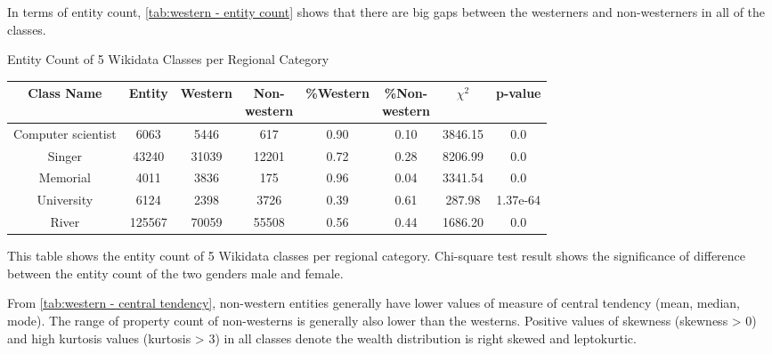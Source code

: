 In terms of entity count, \autoref{tab:western - entity count} shows that there are big gaps between the westerners and non-westerners in all of the classes.

\begin{center}
\scriptsize
\begin{threeparttable}
\captionsetup{font=small}
\caption{Entity Count of 5 Wikidata Classes per Regional Category}
\label{tab:western - entity count}
\begin{tabular}{c | c c c c c c c} 

\toprule
    Class Name & Entity & Western & \CellWithForceBreak{Non- \\ western} & \%Western & \CellWithForceBreak{\%Non- \\ western}& $\chi^2$ & p-value \\ [0.5ex] 
\midrule
    Computer scientist & 6063 & 5446 & 617 & 0.90 & 0.10 & 3846.15 & 0.0 \\
    Singer & 43240 & 31039 & 12201 & 0.72 & 0.28 & 8206.99 & 0.0 \\
    Memorial & 4011 & 3836 & 175 & 0.96 & 0.04 & 3341.54 & 0.0 \\
    University & 6124 & 2398 & 3726 & 0.39 & 0.61 & 287.98 & 1.37e-64 \\
    River & 125567 & 70059 & 55508 & 0.56 & 0.44 & 1686.20 & 0.0 \\
    [1ex]
\bottomrule
\end{tabular}
\begin{tablenotes}
    \scriptsize
    \item{This table shows the entity count of 5 Wikidata classes per regional category. Chi-square test result shows the significance of difference between the entity count of the two genders male and female.}
\end{tablenotes}
\end{threeparttable}
\end{center}

From \autoref{tab:western - central tendency}, non-western entities generally have lower values of measure of central tendency (mean, median, mode). The range of property count of non-westerns is generally also lower than the westerns. Positive values of skewness (skewness > 0) and high kurtosis values (kurtosis > 3) in all classes denote the wealth distribution is right skewed and leptokurtic.

